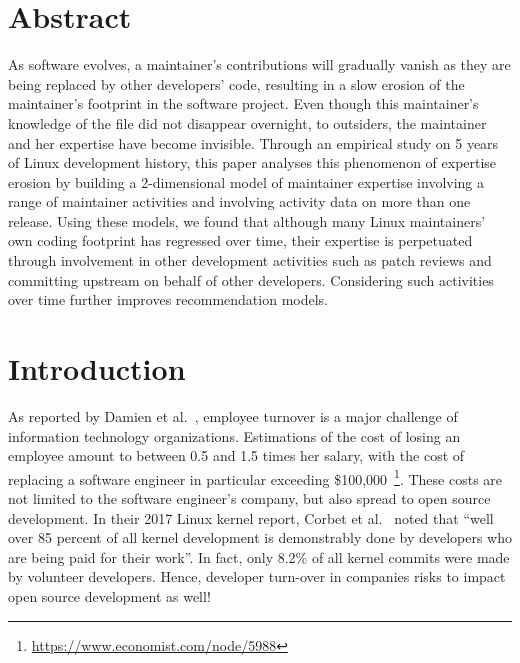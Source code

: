 \label{sec:Theme3}

\section{Abstract}

As software evolves, a maintainer's contributions will gradually vanish as they are being replaced by other developers' code, resulting in a slow erosion of the maintainer's footprint in the software project. Even though this maintainer's knowledge of the file did not disappear overnight, to outsiders, the maintainer and her expertise have become invisible. Through an empirical study on 5 years of Linux development history, this paper analyses this phenomenon of expertise erosion by building a 2-dimensional model of maintainer expertise involving a range of maintainer activities and involving activity data on more than one release. Using these models, we found that although many Linux maintainers' own coding footprint has regressed over time, their expertise is perpetuated through involvement in other development activities such as patch reviews and committing upstream on behalf of other developers. Considering such activities over time further improves recommendation models.


\section{Introduction}

As reported by Damien et al.~\cite{turnover}, employee turnover is a major challenge of information technology organizations. Estimations of the cost of losing an employee amount to between 0.5 and 1.5 times her salary, with the cost of replacing a software engineer in particular exceeding \$100,000~\footnote{\url{https://www.economist.com/node/5988}}. These costs are not limited to the software engineer's company, but also spread to open source development. In their 2017 Linux kernel report, Corbet et al.~\cite{corbet17} noted that ``well over 85 percent of all kernel development is demonstrably done by developers who are being paid for their work''. In fact, only 8.2\% of all kernel commits were made by volunteer developers. Hence, developer turn-over in companies risks to impact open source development as well!



